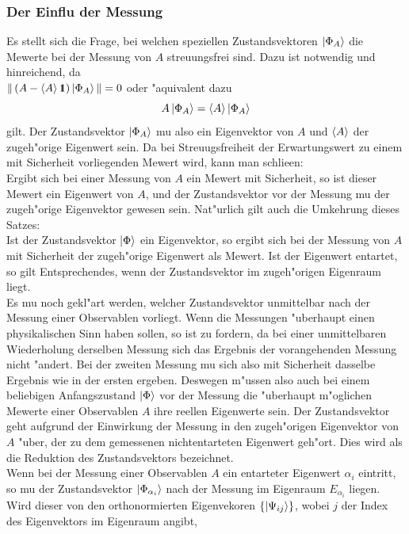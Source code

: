        \subsubsection{Der Einflu\3{} der Messung}
         Es stellt sich die Frage, bei welchen speziellen Zustandsvektoren $\left| \Phi_A \right>$ die Me\3werte bei der Messung von $A$ streuungsfrei sind. Dazu ist notwendig und
         hinreichend, da\3 \\ $\| \left(A-\left< A \right>\hbox{\small1\kern-3.8pt\normalsize1}\right)\left| \Phi_A \right>\| = 0$ oder "aquivalent dazu
         $$ A\left| \Phi_A \right> = \left< A \right>\left| \Phi_A \right> $$
         gilt. Der Zustandsvektor $\left| \Phi_A \right>$ mu\3 also ein Eigenvektor von $A$ und $\left< A \right>$ der zugeh"orige Eigenwert sein. Da bei Streuugsfreiheit der 
         Erwartungswert zu einem mit Sicherheit vorliegenden Me\3wert wird, kann man schlie\3en: \\
         Ergibt sich bei einer Messung von $A$ ein Me\3wert mit Sicherheit, so ist dieser Me\3wert ein Eigenwert von $A$, und der Zustandsvektor vor der Messung mu\3
         der zugeh"orige Eigenvektor gewesen sein. Nat"urlich gilt auch die Umkehrung dieses Satzes: \\
         Ist der Zustandsvektor $\left| \Phi \right>$ ein Eigenvektor, so ergibt sich bei der Messung von $A$ mit Sicherheit der zugeh"orige Eigenwert als Me\3wert. Ist der
         Eigenwert entartet, so gilt Entsprechendes, wenn der Zustandsvektor im zugeh"origen Eigenraum liegt. \\
         Es mu\3 noch gekl"art werden, welcher Zustandsvektor unmittelbar nach der Messung einer Observablen vorliegt. Wenn die Messungen "uberhaupt einen 
         physikalischen Sinn haben sollen, so ist zu fordern, da\3 bei einer unmittelbaren Wiederholung derselben Messung sich das Ergebnis der vorangehenden Messung nicht
         "andert. Bei der zweiten Messung mu\3 sich also mit Sicherheit dasselbe Ergebnis wie in der ersten ergeben. Deswegen m"ussen  also auch bei einem beliebigen                Anfangszustand $\left| \Phi \right>$ vor der Messung die "uberhaupt m"oglichen Me\3werte einer Observablen $A$ ihre reellen Eigenwerte sein. Der Zustandsvektor geht
         aufgrund der Einwirkung der Messung in den zugeh"origen Eigenvektor von $A$ "uber, der zu dem gemessenen nichtentarteten Eigenwert geh"ort. Dies wird
         als die Reduktion des Zustandsvektors bezeichnet. \\
         Wenn bei der Messung einer Observablen $A$ ein entarteter Eigenwert $\alpha_i$ eintritt, so mu\3 der Zustandsvektor $\left| \Phi_{\alpha_i} \right>$ nach der Messung im
         Eigenraum $E_{\alpha_i}$ liegen. Wird dieser von den orthonormierten Eigenvekoren $\left\{ \left| \Psi_{ij} \right> \right\}$, wobei $j$ der Index des Eigenvektors im Eigenraum angibt,
